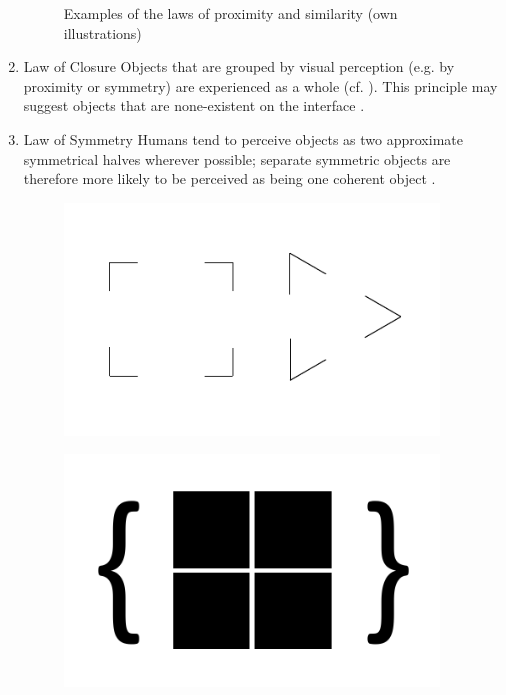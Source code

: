\begin{enumerate}
\begin{figure}[H]
\begin{minipage}[b]{.5\linewidth}
            \label{fig:sim}
        \end{minipage}
        \caption[Laws of Proximity and Similarity]{Examples of the laws of proximity and similarity (own illustrations)}\label{fig:law1}
    \end{figure}
    \item{Law of Closure} Objects that are grouped by visual perception (e.g. by proximity or symmetry) are experienced as a whole (cf. ). This principle may suggest objects that are none-existent on the interface \parencite[cf.][]{Stevenson.n.y.}.
    \item{Law of Symmetry} Humans tend to perceive objects as two approximate symmetrical halves wherever possible; separate symmetric objects are therefore more likely to be perceived as being one coherent object \parencite[cf.][]{Soegaard.n.y.}.
    \begin{figure}[H] 
        \begin{minipage}[b]{.5\linewidth}
            \centering\includegraphics[width=0.94\textwidth]{img/closure.pdf}
            \label{fig:clo}
        \end{minipage}%
        \begin{minipage}[b]{.5\linewidth}
            \centering\includegraphics[width=0.94\textwidth]{img/symmetry.pdf}

\end{minipage}
\end{figure}
\end{enumerate}
